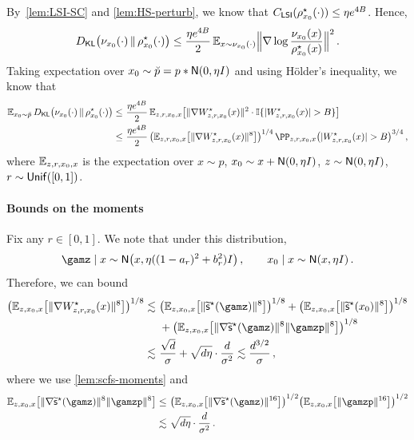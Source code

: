 By~\cref{lem:LSI-SC} and \cref{lem:HS-perturb}, we know that
$C_{\mathsf{LSI}}(\rho^\star_{x_0}(\cdot))\leq \eta e^{4B}$. Hence,
\begin{align*}
    \Dkl{\piz{\cdot}}{\rhosz{\cdot}}\leq \frac{\eta e^{4B}}{2} \En_{x\sim \piz{\cdot}} \nrm[\Big]{\nabla \log \frac{\piz{x}}{\rhosz{x}}}^2\,.
\end{align*}
Taking expectation over $\xz\sim \breve p=p*\Neta$ and using H\"older's inequality, we know that
\begin{align*}
    \En_{\xz\sim \breve p} \Dkl{\piz{\cdot}}{\rhosz{\cdot}}
    \leq&~ \frac{\eta e^{4B}}{2}  \En_{z,r,\xz,x}\brk*{ \nrm{\nabla \epsxz}^2 \cdot \indic\crl{\abs{\epsxz}>\B} } \\
    \leq&~ \frac{\eta e^{4B}}{2}\, \prn*{\En_{z,r,\xz,x}\brk*{ \nrm{\nabla \epsxz}^8}}^{1/4}\, \PP_{z,r,\xz,x}\prn*{\abs{\epsxz}>\B}^{3/4}\,, 
\end{align*}
where $\operatorname{\mathbb{E}}_{z,r,x_0,x}$ is the expectation over $x\sim p$, $\xz\sim x+\Neta$, $z\sim \Neta$, $r\sim \mathsf{Unif}([0,1])$.

\paragraph{Bounds on the moments}
Fix any $r\in[0,1]$.
We note that under this distribution, 
\begin{align*}
    \gamz\mid x\sim \normal{x, \eta((1-\alr)^2+\blr^2)\Id}\,, \qquad \xz\mid x\sim \normal{x, \eta\Id}\,.
\end{align*}
Therefore, we can bound
\begin{align*}
    \prn*{\En_{z,\xz,x}\brk*{ \nrm{\nabla \epsxz}^8}}^{1/8}
    \leqsim&~
    \prn*{\En_{z,\xz,x}\brk*{ \nrm{\tscfs(\gamz)}^8}}^{1/8} 
    +\prn*{\En_{z,\xz,x}\brk*{ \nrm{\tscfs(\xz)}^8}}^{1/8} \\
    &~ +\prn*{\En_{z,\xz,x}\brk*{ \nrm{\nabla \tscfs(\gamz)}^8 \nrm{\gamzp}^8}}^{1/8} \\
    \leqsim &~ \frac{\sqrt{d}}{\sigma}+\sqrt{d\eta}\cdot \frac{d}{\sigma^2} \leqsim \frac{d^{3/2}}{\sigma}\,,
\end{align*}
where we use \cref{lem:scfs-moments} and
\begin{align*}
    \En_{z,\xz,x}\brk*{ \nrm{\nabla \tscfs(\gamz)}^8 \nrm{\gamzp}^8}
    \leq&~ \prn*{\En_{z,\xz,x}\brk*{ \nrm{\nabla \tscfs(\gamz)}^{16}}}^{1/2} \prn*{\En_{z,\xz,x}\brk*{ \nrm{\gamzp}^{16}}}^{1/2} \\
    \leqsim&~ \sqrt{d\eta}\cdot \frac{d}{\sigma^2}\,.
\end{align*}




